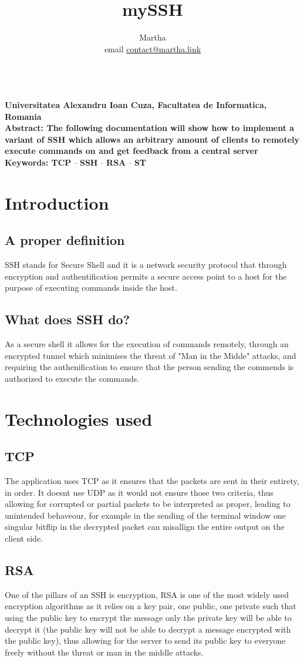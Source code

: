 \documentclass{article}
\author{Martha \\ email \href{mailto:contact@martha.link}{contact@martha.link} }
\title{mySSH}
\renewcommand{\maketitle}{
\begin{center}
  {\huge\bfseries
  \thetitle}

  \vspace{.5em}
    \bfseries
    \theauthor \\
    \textnormal{
        Universitatea Alexandru Ioan Cuza, Facultatea de Informatica, Romania\\}
    Abstract:
    \textnormal{
        The following documentation will show how to implement a variant of SSH which allows an arbitrary amount of clients to remotely execute commands on and get feedback from a central server} \\
    Keywords:
    \textnormal{
        TCP $\cdot$ SSH $\cdot$ RSA $\cdot$ ST}
   \end{center}
}
\begin{document}
 
	\maketitle
	\section{Introduction}
    \subsection{A proper definition}
        SSH stands for Secure Shell and it is a network security protocol that through encryption and authentification permits a secure access point to a host for the purpose of executing commands inside the host.
    \subsection{What does SSH do?}
        As a secure shell it allows for the execution of commands remotely, through an encrypted tunnel which minimises the threat of "Man in the Midde" attacks, and requiring the authenification to ensure that the person sending the commends is authorized to execute the commands.
    
    \section{Technologies used}
    \subsection{TCP}
    The application uses TCP as it ensures that the packets are sent in their entirety, in order. It doesnt use UDP as it would not ensure those two criteria, thus allowing for corrupted or partial packets to be interpreted as proper, leading to unintended behaveour, for example in the sending of the terminal window one singular bitflip in the decrypted packet can misallign the entire output on the client side.

    \subsection{RSA}
    One of the pillars of an SSH is encryption, RSA is one of the most widely used encryption algorithms as it relies on a key pair, one public, one private such that using the public key to encrypt the message only the private key will be able to decrypt it (the public key will not be able to decrypt a message encrypted with the public key), thus allowing for the server to send its public key to everyone freely without the threat or man in the middle attacks.
\end{document}
